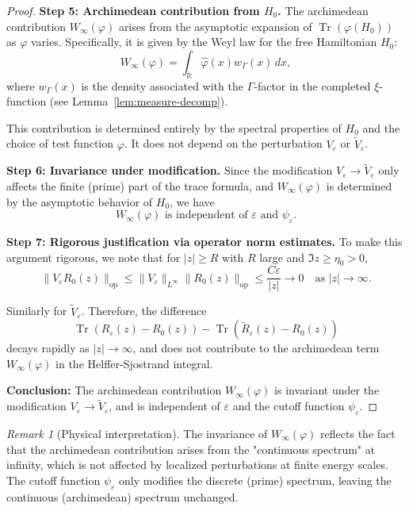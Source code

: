 ﻿\documentclass[12pt,a4paper]{article}
\theoremstyle{definition}
\theoremstyle{remark}
\newtheorem{remark}[theorem]{Remark}
\newcommand{\RR}{\mathbb{R}}
\newcommand{\Tr}{\operatorname{Tr}}
\begin{document}
\begin{proof}
\textbf{Step 5: Archimedean contribution from $H_0$.}
The archimedean contribution $W_\infty(\varphi)$ arises from the asymptotic expansion of $\Tr(\varphi(H_0))$ as $\varphi$ varies. Specifically, it is given by the Weyl law for the free Hamiltonian $H_0$:
\[
  W_\infty(\varphi) = \int_\RR \widehat{\varphi}(x) w_\Gamma(x) \, dx,
\]
where $w_\Gamma(x)$ is the density associated with the $\Gamma$-factor in the completed $\xi$-function (see Lemma~\ref{lem:measure-decomp}).

This contribution is determined entirely by the spectral properties of $H_0$ and the choice of test function $\varphi$. It does not depend on the perturbation $V_\varepsilon$ or $\widetilde{V}_\varepsilon$.

\textbf{Step 6: Invariance under modification.}
Since the modification $V_\varepsilon \to \widetilde{V}_\varepsilon$ only affects the finite (prime) part of the trace formula, and $W_\infty(\varphi)$ is determined by the asymptotic behavior of $H_0$, we have
\[
  W_\infty(\varphi) \text{ is independent of } \varepsilon \text{ and } \psi_\varepsilon.
\]

\textbf{Step 7: Rigorous justification via operator norm estimates.}
To make this argument rigorous, we note that for $|z| \geq R$ with $R$ large and $\Im z \geq \eta_0 > 0$,
\[
  \|V_\varepsilon R_0(z)\|_{\text{op}} \leq \|V_\varepsilon\|_{L^\infty} \|R_0(z)\|_{\text{op}} \leq \frac{C \varepsilon}{|z|} \to 0 \quad \text{as } |z| \to \infty.
\]

Similarly for $\widetilde{V}_\varepsilon$. Therefore, the difference
\[
  \Tr(R_\varepsilon(z) - R_0(z)) - \Tr(\widetilde{R}_\varepsilon(z) - R_0(z))
\]
decays rapidly as $|z| \to \infty$, and does not contribute to the archimedean term $W_\infty(\varphi)$ in the Helffer-Sjostrand integral.

\textbf{Conclusion:}
The archimedean contribution $W_\infty(\varphi)$ is invariant under the modification $V_\varepsilon \to \widetilde{V}_\varepsilon$, and is independent of $\varepsilon$ and the cutoff function $\psi_\varepsilon$.
\end{proof}

\begin{remark}[Physical interpretation]
The invariance of $W_\infty(\varphi)$ reflects the fact that the archimedean contribution arises from the "continuous spectrum" at infinity, which is not affected by localized perturbations at finite energy scales. The cutoff function $\psi_\varepsilon$ only modifies the discrete (prime) spectrum, leaving the continuous (archimedean) spectrum unchanged.
\end{remark}
\end{document}
